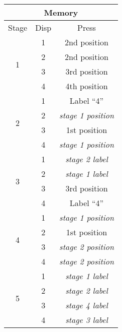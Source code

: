 \documentclass[11pt]{article}
\begin{document}
\begin{multicols}{3}

\begin{tabular}{|c|c|c|}
\hline
\multicolumn{3}{|c|}{Memory} \\
\hline
Stage & Disp & Press \\
\hline
\multirow{4}{*}{1} & 1 & 2nd position \\
                         & 2 & 2nd position \\
                         & 3 & 3rd position \\
                         & 4 & 4th position \\
\hline
\multirow{4}{*}{2} & 1 & Label ``4'' \\
                         & 2 & \textit{stage 1 position} \\
                         & 3 & 1st position \\
                         & 4 & \textit{stage 1 position} \\
\hline
\multirow{4}{*}{3} & 1 & \textit{stage 2 label} \\
                         & 2 & \textit{stage 1 label} \\
                         & 3 & 3rd position \\
                         & 4 & Label ``4'' \\
\hline
\multirow{4}{*}{4} & 1 & \textit{stage 1 position} \\
                         & 2 & 1st position \\
                         & 3 & \textit{stage 2 position} \\
                         & 4 & \textit{stage 2 position} \\
\hline
\multirow{4}{*}{5} & 1 & \textit{stage 1 label} \\
                         & 2 & \textit{stage 2 label} \\
                         & 3 & \textit{stage 4 label} \\
                         & 4 & \textit{stage 3 label} \\
\hline
\end{tabular}


\end{multicols}
\end{document}
